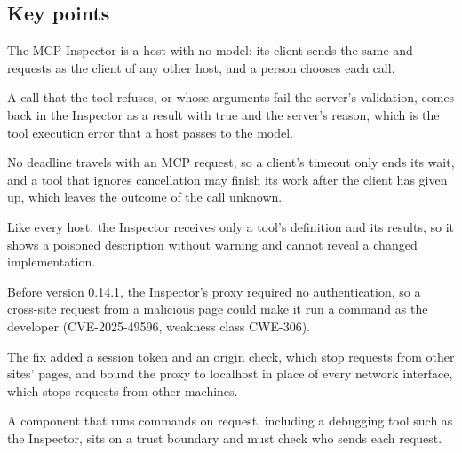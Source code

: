 \subsection*{Key points}
\bi
\item The MCP Inspector is a host with no model: its client sends the same  and
 requests as the client of any other host, and a person chooses each call.
\item A call that the tool refuses, or whose arguments fail the server's validation, comes back in
the Inspector as a result with  true and the server's reason, which is the tool
execution error that a host passes to the model.
\item No deadline travels with an MCP request, so a client's timeout only ends its wait, and a tool
that ignores cancellation may finish its work after the client has given up, which leaves the
outcome of the call unknown.
\item Like every host, the Inspector receives only a tool's definition and its results, so it shows
a poisoned description without warning and cannot reveal a changed implementation.
\item Before version 0.14.1, the Inspector's proxy required no authentication, so a cross-site
request from a malicious page could make it run a command as the developer (CVE-2025-49596,
weakness class CWE-306).
\item The fix added a session token and an origin check, which stop requests from other sites'
pages, and bound the proxy to localhost in place of every network interface, which stops requests
from other machines.
\item A component that runs commands on request, including a debugging tool such as the Inspector,
sits on a trust boundary and must check who sends each request.
\ei
